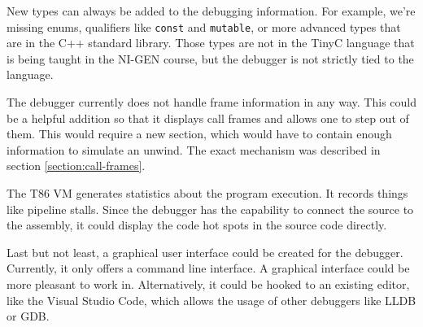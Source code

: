 New types can always be added to the debugging information. For example, we're
missing enums, qualifiers like \texttt{const} and \texttt{mutable}, or more
advanced types that are in the C++ standard library. Those types are not in the
TinyC language that is being taught in the NI-GEN course, but the debugger is
not strictly tied to the language.

The debugger currently does not handle frame information in any way. This could
be a helpful addition so that it displays call frames and allows one to step
out of them. This would require a new section, which would have to contain
enough information to simulate an unwind. The exact mechanism was described in
section \ref{section:call-frames}.

The T86 VM generates statistics about the program execution. It records things
like pipeline stalls. Since the debugger has the capability to connect the
source to the assembly, it could display the code hot spots in the source code
directly.

Last but not least, a graphical user interface could be created for the
debugger. Currently, it only offers a command line interface. A graphical
interface could be more pleasant to work in. Alternatively, it could be hooked
to an existing editor, like the Visual Studio Code, which allows the usage of
other debuggers like LLDB or GDB.
